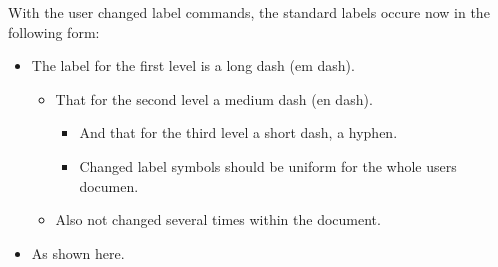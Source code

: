 \documentclass{article}
\begin{document}
With the user changed label commands, the standard labels occure now
in the following form:
\begin{itemize}
\item The label for the first level is a long dash (em dash).
\begin{itemize}
\item That for the second level a medium dash (en dash).
\begin{itemize}
\item And that for the third level a short dash, a hyphen.
\item Changed label symbols should be uniform for the whole users documen.
\end{itemize}
\item Also not changed several times within the document.
\end{itemize}
\item As shown here.
\end{itemize}
\end{document}
